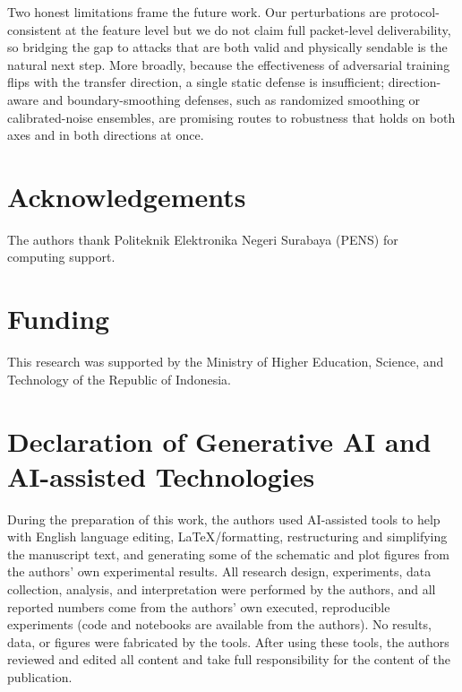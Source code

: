 \documentclass[11pt,a4paper]{article}
\begin{document}
Two honest limitations frame the future work. Our perturbations are
protocol-consistent at the feature level but we do not claim full packet-level
deliverability, so bridging the gap to attacks that are both valid and physically
sendable is the natural next step. More broadly, because the effectiveness of
adversarial training flips with the transfer direction, a single static defense is
insufficient; direction-aware and boundary-smoothing defenses, such as randomized
smoothing or calibrated-noise ensembles, are promising routes to robustness that
holds on both axes and in both directions at once.

\section*{Acknowledgements}
The authors thank Politeknik Elektronika Negeri Surabaya (PENS) for computing
support.

\section*{Funding}
This research was supported by the Ministry of Higher Education, Science, and Technology
of the Republic of Indonesia.

\section*{Declaration of Generative AI and AI-assisted Technologies}
During the preparation of this work, the authors used AI-assisted tools to help with
English language editing, LaTeX/formatting, restructuring and simplifying the manuscript
text, and generating some of the schematic and plot figures from the authors' own
experimental results. All research design, experiments, data collection, analysis, and
interpretation were performed by the authors, and all reported numbers come from the
authors' own executed, reproducible experiments (code and notebooks are available from
the authors). No results, data, or figures were fabricated by the tools. After using
these tools, the authors reviewed and edited all content and take full responsibility
for the content of the publication.
\end{document}
